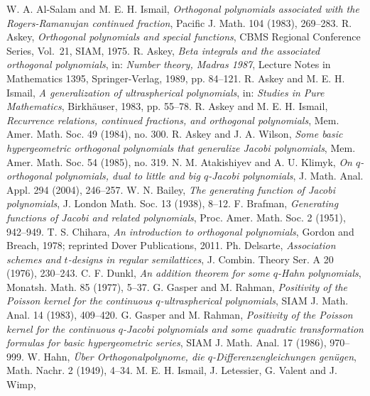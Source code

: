 \documentclass[twoside,11pt]{article}
\newcommand\mybibitem[1]{\bibitem[#1]{#1}\hypertarget{#1}{}}
\newcommand\mybibitemKLS[1]{\bibitem[#1]{#1}\hypertarget{KLS#1}{}}
\begin{document}
\begin{thebibliography}{999}
\label{sec_ref2}
%
\mybibitemKLS{24}
W. A. Al-Salam and M. E. H. Ismail,
{\em Orthogonal polynomials associated with the Rogers-Ramanujan continued fraction},
Pacific J. Math. 104 (1983), 269--283.
%
\mybibitemKLS{46}
R. Askey,
{\em Orthogonal polynomials and special functions},
CBMS Regional Conference Series, Vol.~21, SIAM, 1975.
%
\mybibitemKLS{51}
 R. Askey,
{\em Beta integrals and the associated orthogonal polynomials},
in: {\em Number theory, Madras 1987},
Lecture Notes in Mathematics 1395, Springer-Verlag, 1989,  pp. 84--121.
%
\mybibitemKLS{63}
R. Askey and M. E. H. Ismail,
{\em A generalization of ultraspherical polynomials},
in: {\em Studies in Pure Mathematics},
Birkh\"auser, 1983, pp. 55--78.
%
\mybibitemKLS{64}
R. Askey and M. E. H. Ismail,
{\em Recurrence relations, continued fractions, and orthogonal polynomials},
Mem. Amer. Math. Soc. 49 (1984), no. 300.
%
\mybibitemKLS{72}
R. Askey and J. A. Wilson,
{\em Some basic hypergeometric orthogonal polynomials that generalize Jacobi polynomials},
Mem. Amer. Math. Soc. 54 (1985), no. 319.
%
\mybibitemKLS{79}
N. M. Atakishiyev and A. U. Klimyk,
{\em On $q$-orthogonal polynomials, dual to little and big
$q$-Jacobi polynomials},
J. Math. Anal. Appl. 294 (2004), 246--257.
%
\mybibitemKLS{91}
W. N. Bailey,
{\em The generating function of Jacobi polynomials},
J. London Math. Soc. 13 (1938), 8--12.
%
\mybibitemKLS{109}
F. Brafman,
{\em Generating functions of Jacobi and related polynomials},
Proc. Amer. Math. Soc. 2 (1951), 942--949.
%
\mybibitemKLS{146}
T. S. Chihara,
{\em An introduction to orthogonal polynomials}, Gordon and Breach, 1978;
reprinted Dover Publications, 2011.
%
\mybibitemKLS{161}
Ph. Delsarte, {\em Association schemes and $t$-designs in regular
semilattices}, J. Combin. Theory Ser. A 20 (1976), 230--243.
%
\mybibitemKLS{186}
C. F. Dunkl,
{\em An addition theorem for some $q$-Hahn polynomials},
Monatsh. Math. 85 (1977), 5--37.
%
\mybibitemKLS{234}
G. Gasper and M. Rahman,
{\em Positivity of the Poisson kernel for the continuous
$q$-ultraspherical polynomials},
SIAM J. Math. Anal. 14 (1983), 409--420.
%
\mybibitem{236}
 G. Gasper and M. Rahman,
{\em Positivity of the Poisson kernel for the continuous $q$-Jacobi
polynomials and some quadratic transformation formulas for basic
hypergeometric series},
SIAM J. Math. Anal. 17 (1986), 970--999.
%
\mybibitemKLS{261}
W. Hahn,
{\em \"Uber Orthogonalpolynome, die $q$-Differenzengleichungen gen\"ugen},
Math. Nachr. 2 (1949), 4--34.
%
\mybibitemKLS{281}
M. E. H. Ismail, J. Letessier,  G. Valent and J. Wimp,

\end{thebibliography}
\end{document}
